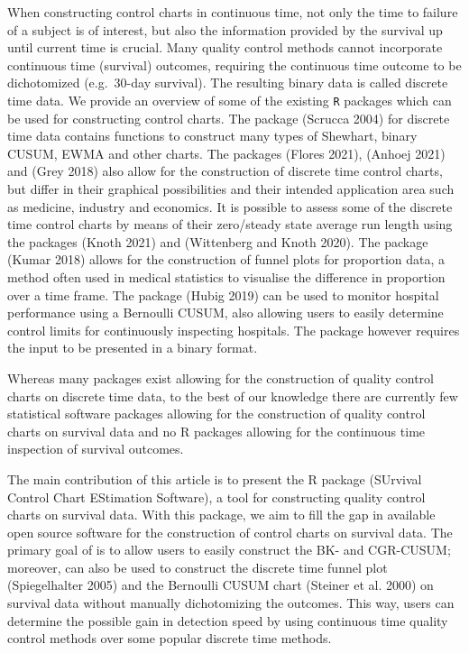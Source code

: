 When constructing control charts in continuous time, not only the time to failure of a subject is of interest, but also the information provided by the survival up until current time is crucial. Many quality control methods cannot incorporate continuous time (survival) outcomes, requiring the continuous time outcome to be dichotomized (e.g.~30-day survival). The resulting binary data is called discrete time data. We provide an overview of some of the existing \texttt{R} packages which can be used for constructing control charts. The package  (Scrucca 2004) for discrete time data contains functions to construct many types of Shewhart, binary CUSUM, EWMA and other charts. The packages  (Flores 2021),  (Anhoej 2021) and  (Grey 2018) also allow for the construction of discrete time control charts, but differ in their graphical possibilities and their intended application area such as medicine, industry and economics. It is possible to assess some of the discrete time control charts by means of their zero/steady state average run length using the packages  (Knoth 2021) and  (Wittenberg and Knoth 2020). The package  (Kumar 2018) allows for the construction of funnel plots for proportion data, a method often used in medical statistics to visualise the difference in proportion over a time frame. The package  (Hubig 2019) can be used to monitor hospital performance using a Bernoulli CUSUM, also allowing users to easily determine control limits for continuously inspecting hospitals. The package however requires the input to be presented in a binary format.

Whereas many packages exist allowing for the construction of quality control charts on discrete time data, to the best of our knowledge there are currently few statistical software packages allowing for the construction of quality control charts on survival data and no R packages allowing for the continuous time inspection of survival outcomes.

The main contribution of this article is to present the R package  (SUrvival Control Chart EStimation Software), a tool for constructing quality control charts on survival data. With this package, we aim to fill the gap in available open source software for the construction of control charts on survival data. The primary goal of  is to allow users to easily construct the BK- and CGR-CUSUM; moreover,  can also be used to construct the discrete time funnel plot (Spiegelhalter 2005) and the Bernoulli CUSUM chart (Steiner et al. 2000) on survival data without manually dichotomizing the outcomes. This way, users can determine the possible gain in detection speed by using continuous time quality control methods over some popular discrete time methods.

